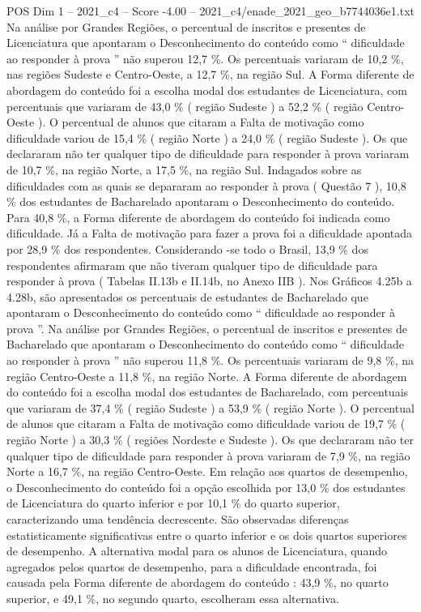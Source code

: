 \begin{textsample}{POS Dim 1 – 2021\_c4 – Score -4.00 – 2021\_c4/enade\_2021\_geo\_b7744036e1.txt}
Na análise por Grandes Regiões, o percentual de inscritos e presentes de Licenciatura que apontaram o Desconhecimento do conteúdo como “ dificuldade ao responder à prova ” não superou 12,7 \%.
Os percentuais variaram de 10,2 \%, nas regiões Sudeste e Centro-Oeste, a 12,7 \%, na região Sul.
A Forma diferente de abordagem do conteúdo foi a escolha modal dos estudantes de Licenciatura, com percentuais que variaram de 43,0 \% ( região Sudeste ) a 52,2 \% ( região Centro-Oeste ).
O percentual de alunos que citaram a Falta de motivação como dificuldade variou de 15,4 \% ( região Norte ) a 24,0 \% ( região Sudeste ).
Os que declararam não ter qualquer tipo de dificuldade para responder à prova variaram de 10,7 \%, na região Norte, a 17,5 \%, na região Sul.
Indagados sobre as dificuldades com as quais se depararam ao responder à prova ( Questão 7 ), 10,8 \% dos estudantes de Bacharelado apontaram o Desconhecimento do conteúdo.
Para 40,8 \%, a Forma diferente de abordagem do conteúdo foi indicada como dificuldade.
Já a Falta de motivação para fazer a prova foi a dificuldade apontada por 28,9 \% dos respondentes.
Considerando -se todo o Brasil, 13,9 \% dos respondentes afirmaram que não tiveram qualquer tipo de dificuldade para responder à prova ( Tabelas II.13b e II.14b, no Anexo IIB ).
Nos Gráficos 4.25b a 4.28b, são apresentados os percentuais de estudantes de Bacharelado que apontaram o Desconhecimento do conteúdo como “ dificuldade ao responder à prova ”.
Na análise por Grandes Regiões, o percentual de inscritos e presentes de Bacharelado que apontaram o Desconhecimento do conteúdo como “ dificuldade ao responder à prova ” não superou 11,8 \%.
Os percentuais variaram de 9,8 \%, na região Centro-Oeste a 11,8 \%, na região Norte.
A Forma diferente de abordagem do conteúdo foi a escolha modal dos estudantes de Bacharelado, com percentuais que variaram de 37,4 \% ( região Sudeste ) a 53,9 \% ( região Norte ).
O percentual de alunos que citaram a Falta de motivação como dificuldade variou de 19,7 \% ( região Norte ) a 30,3 \% ( regiões Nordeste e Sudeste ).
Os que declararam não ter qualquer tipo de dificuldade para responder à prova variaram de 7,9 \%, na região Norte a 16,7 \%, na região Centro-Oeste.
Em relação aos quartos de desempenho, o Desconhecimento do conteúdo foi a opção escolhida por 13,0 \% dos estudantes de Licenciatura do quarto inferior e por 10,1 \% do quarto superior, caracterizando uma tendência decrescente.
São observadas diferenças estatisticamente significativas entre o quarto inferior e os dois quartos superiores de desempenho.
A alternativa modal para os alunos de Licenciatura, quando agregados pelos quartos de desempenho, para a dificuldade encontrada, foi causada pela Forma diferente de abordagem do conteúdo : 43,9 \%, no quarto superior, e 49,1 \%, no segundo quarto, escolheram essa alternativa.

\end{textsample}
